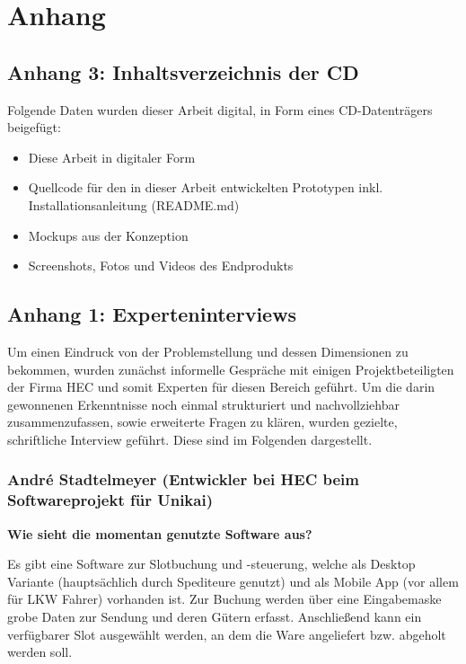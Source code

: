 \section*{Anhang}
\renewcommand{\leftmark}{Anhang}

\subsection*{Anhang 3: Inhaltsverzeichnis der CD}
%
\label{appendix:digital}

Folgende Daten wurden dieser Arbeit digital, in Form eines CD-Datenträgers beigefügt:

\begin{itemize}
    \item Diese Arbeit in digitaler Form
    \item Quellcode für den in dieser Arbeit entwickelten Prototypen inkl. Installationsanleitung (README.md)
    \item Mockups aus der Konzeption
    \item Screenshots, Fotos und Videos des Endprodukts
\end{itemize}


\subsection*{Anhang 1: Experteninterviews}
%
\label{sec:appendixInterviews}

Um einen Eindruck von der Problemstellung und dessen Dimensionen zu bekommen, wurden zunächst informelle Gespräche mit einigen Projektbeteiligten der Firma HEC und somit Experten für diesen Bereich geführt. Um die darin gewonnenen Erkenntnisse noch einmal strukturiert und nachvollziehbar zusammenzufassen, sowie erweiterte Fragen zu klären, wurden gezielte, schriftliche Interview geführt. Diese sind im Folgenden dargestellt. 

\subsubsection*{André Stadtelmeyer (Entwickler bei HEC beim Softwareprojekt für Unikai)}

\textbf{Wie sieht die momentan genutzte Software aus?}

Es gibt eine Software zur Slotbuchung und -steuerung, welche als Desktop Variante (hauptsächlich durch Spediteure genutzt) und als Mobile App (vor allem für LKW Fahrer) vorhanden ist. Zur Buchung werden über eine Eingabemaske grobe Daten zur Sendung und deren Gütern erfasst. Anschließend kann ein verfügbarer Slot ausgewählt werden, an dem die Ware angeliefert bzw. abgeholt werden soll.

